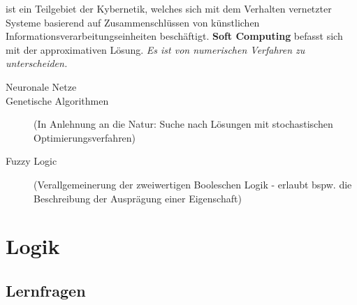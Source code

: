 \documentclass[runningheads,deutsch]{llncs}
\begin{document}
ist ein Teilgebiet der Kybernetik, welches sich mit dem Verhalten vernetzter Systeme basierend auf Zusammenschlüssen von künstlichen Informationsverarbeitungseinheiten beschäftigt. \textbf{Soft Computing} befasst sich mit der approximativen Lösung. \textit{Es ist von numerischen Verfahren zu unterscheiden.}

\begin{description}
    \item[ Neuronale Netze]
    \item[ Genetische Algorithmen ] (In Anlehnung an die Natur: Suche nach Lösungen mit stochastischen Optimierungsverfahren)
    \item[ Fuzzy Logic ] (Verallgemeinerung der zweiwertigen Booleschen Logik - erlaubt bspw. die Beschreibung der Ausprägung einer Eigenschaft)
\end{description}



\section{Logik}



\subsection{Lernfragen}
\end{document}
